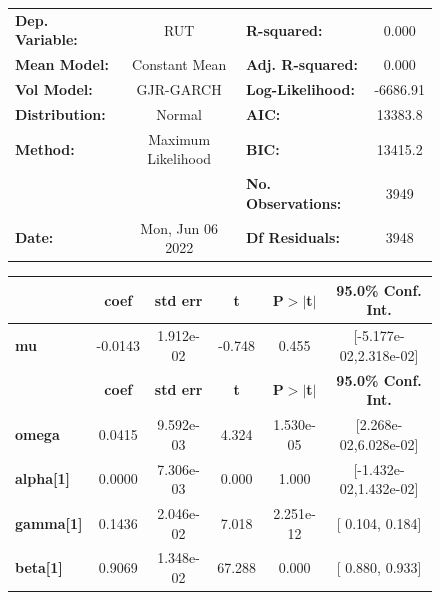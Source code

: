 \documentclass[a4paper, oneside]{discothesis}
\begin{document}
\begin{figure}
\begin{multicols}{2}
{  
\begin{center}
\begin{tabular}{lclc}
\toprule
\textbf{Dep. Variable:} &         RUT        & \textbf{  R-squared:         } &     0.000   \\
\textbf{Mean Model:}    &   Constant Mean    & \textbf{  Adj. R-squared:    } &     0.000   \\
\textbf{Vol Model:}     &     GJR-GARCH      & \textbf{  Log-Likelihood:    } &   -6686.91  \\
\textbf{Distribution:}  &       Normal       & \textbf{  AIC:               } &    13383.8  \\
\textbf{Method:}        & Maximum Likelihood & \textbf{  BIC:               } &    13415.2  \\
\textbf{}               &                    & \textbf{  No. Observations:  } &    3949     \\
\textbf{Date:}          &  Mon, Jun 06 2022  & \textbf{  Df Residuals:      } &    3948     \\
\bottomrule
\end{tabular}
\begin{tabular}{lccccc}
            & \textbf{coef} & \textbf{std err} & \textbf{t} & \textbf{P$> |$t$|$} & \textbf{95.0\% Conf. Int.}  \\
\midrule
\textbf{mu} &      -0.0143  &    1.912e-02     &    -0.748  &          0.455       &   [-5.177e-02,2.318e-02]    \\
                  & \textbf{coef} & \textbf{std err} & \textbf{t} & \textbf{P$> |$t$|$} & \textbf{95.0\% Conf. Int.}  \\
\midrule
\textbf{omega}    &       0.0415  &    9.592e-03     &     4.324  &      1.530e-05       &   [2.268e-02,6.028e-02]     \\
\textbf{alpha[1]} &     0.0000    &    7.306e-03     &   0.000    &          1.000       &   [-1.432e-02,1.432e-02]    \\
\textbf{gamma[1]} &       0.1436  &    2.046e-02     &     7.018  &      2.251e-12       &     [  0.104,  0.184]       \\
\textbf{beta[1]}  &       0.9069  &    1.348e-02     &    67.288  &        0.000         &     [  0.880,  0.933]       \\
\bottomrule
\end{tabular}
\end{center}

}
\end{multicols}
\end{figure}
\end{document}
